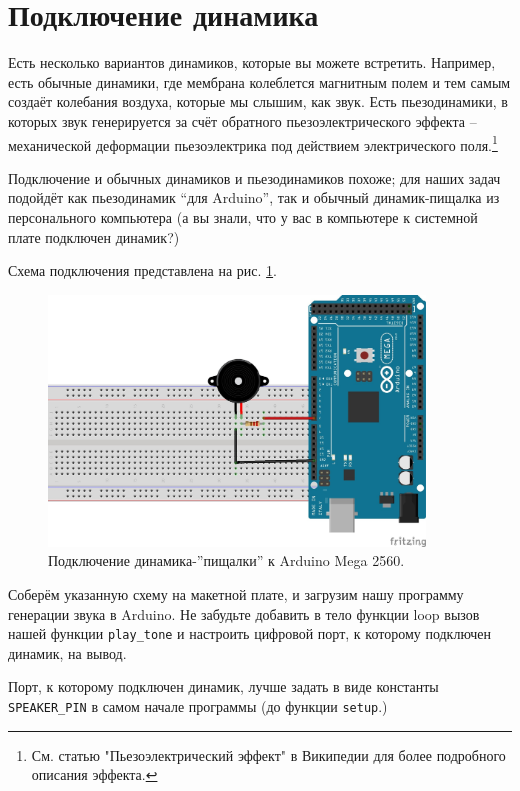 \documentclass[a4paper,twoside]{book}
\begin{document}
\section{Подключение динамика}

Есть несколько вариантов динамиков, которые вы можете встретить. Например, есть
обычные динамики, где мембрана колеблется магнитным полем и тем самым создаёт
колебания воздуха, которые мы слышим, как звук. Есть пьезодинамики, в которых
звук генерируется за счёт обратного пьезоэлектрического эффекта -- механической
деформации пьезоэлектрика под действием электрического поля.\footnote{См. статью
"Пьезоэлектрический эффект" в Википедии для более подробного описания эффекта.}

Подключение и обычных динамиков и пьезодинамиков похоже; для наших задач
подойдёт как пьезодинамик ``для Arduino'', так и обычный динамик-пищалка из
персонального компьютера (а вы знали, что у вас в компьютере к системной плате
подключен динамик?)

Схема подключения представлена на рис. \ref{fig:sound-fig-2}.

\begin{figure}[h]
  \caption{Подключение динамика-''пищалки'' к Arduino Mega 2560.}
  \label{fig:sound-fig-2}
  \includegraphics[width=10cm]{sound-fig-2}
  \centering
\end{figure}

Соберём указанную схему на макетной плате, и загрузим нашу программу генерации
звука в Arduino. Не забудьте добавить в тело функции loop вызов нашей функции
\texttt{play\_tone} и настроить цифровой порт, к которому подключен динамик, на
вывод.

Порт, к которому подключен динамик, лучше задать в виде константы
\texttt{SPEAKER\_PIN} в самом начале программы (до функции \texttt{setup}.)
\end{document}
